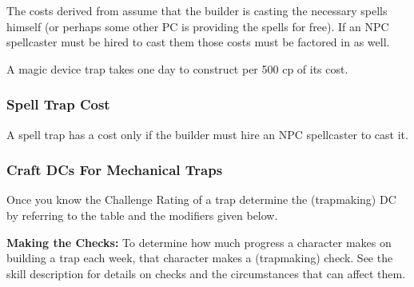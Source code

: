 The costs derived from  assume that the builder is casting the necessary spells himself (or perhaps some other PC is providing the spells for free). If an NPC spellcaster must be hired to cast them those costs must be factored in as well.

A magic device trap takes one day to construct per 500 cp of its cost.


\subsubsection{Spell Trap Cost}
A spell trap has a cost only if the builder must hire an NPC spellcaster to cast it.

\subsubsection{Craft DCs For Mechanical Traps}
Once you know the Challenge Rating of a trap determine the  (trapmaking) DC by referring to the table and the modifiers given below.


\textbf{Making the Checks:} To determine how much progress a character makes on building a trap each week, that character makes a  (trapmaking) check. See the  skill description for details on  checks and the circumstances that can affect them.

